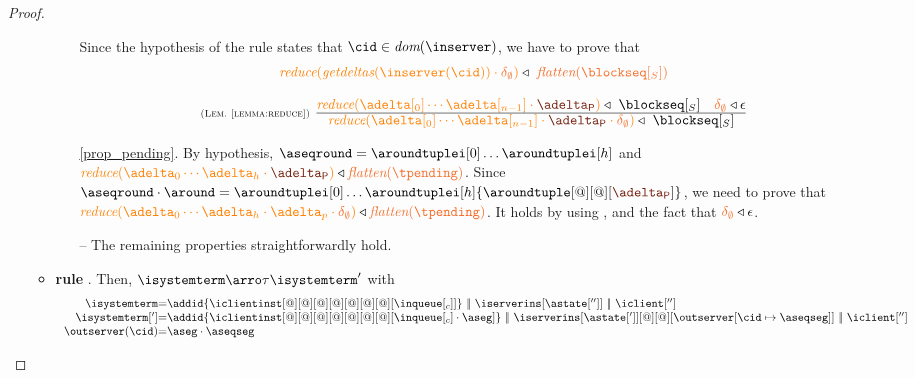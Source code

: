 \begin{proof}
\begin{itemize}
\begin{itemize}
\begin{itemize}
							Since the hypothesis of the rule states that $\cid\in\dom\inserver$, we have to prove that
							\[\ireduce{\igetdeltas{\inserver(\cid)}\cdot \emptydelta} \triangleleft \ \flatten{\tsent} \]
				
							\[
						  	\mathrulean{\lemref{lemma:reduce}}
						  	{\ireduce{\adelta[_0] \cdots \adelta[_{n-1}]\cdot\pushbuffer} \triangleleft \ {\tsent}
								\quad
								\emptydelta \triangleleft \epsilon}
  							{\ireduce{\adelta[_0] \cdots \adelta[_{n-1}]\cdot\pushbuffer\cdot\emptydelta} \triangleleft \ {\tsent}}  
							\]
							
							
			
							\item[\ref{prop_pending}.] By hypothesis, $\pending = \aroundtuplei[0]\ldots\aroundtuplei[h]$ and  
							$\ireduce{\adelta_0\cdots\adelta_h\cdot\pushbuffer} \triangleleft \flatten{\tpending}$.
							 Since $\pending \cdot \around = \aroundtuplei[0]\ldots\aroundtuplei[h]{\aroundtuple[@][@][\pushbuffer]}$,
							we need to prove that  $\ireduce{\adelta_0\cdots\adelta_h\cdot\adelta_p\cdot\emptydelta} \triangleleft \flatten{\tpending}$. 
							It holds by using , and the fact that $\emptydelta \triangleleft \epsilon$.
						\item[{--}] The remaining properties straightforwardly hold.
							
						\end{itemize}


\item {\bf rule }. Then, $\isystemterm  \arroi{\tau} \isystemterm '$ with 
				\[\begin{array}{r@{=}l}
					\isystemterm & \addid{\iclientinst[@][@][@][@][@][@][@][\inclient]} \ \bigpar \ \iserverins[\astate['']] \ \bigpar\ \iclient['']
					\\
					\isystemterm['] & \addid{\iclientinst[@][@][@][@][@][@][@][\inclient\cdot \aseg]} \ \bigpar \ \iserverins[{\astate[']}][@][@][\outserver\upd{\cid}\aseqseg] \ \bigpar\ \iclient['']
					\\
					\outserver(\cid) & \aseg\cdot\aseqseg
					

\end{array}\]
\end{itemize}
\end{itemize}
\end{proof}
